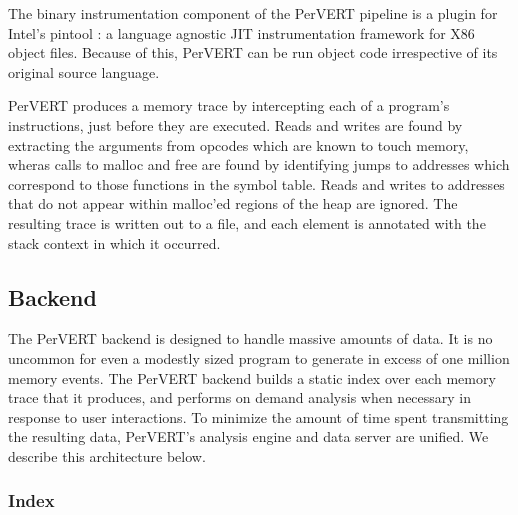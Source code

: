 \documentclass[annual]{acmsiggraph}
\begin{document}
    The binary instrumentation component of the PerVERT pipeline is a plugin for Intel's pintool \cite{Luk:2005:PBC:1065010.1065034}:
      a language agnostic JIT instrumentation framework for X86 object files.
    Because of this, PerVERT can be run object code irrespective of its original source language.

    PerVERT produces a memory trace by intercepting each of a program's instructions, just before they are executed.
    Reads and writes are found by extracting the arguments from opcodes which are known to touch memory,
      wheras calls to malloc and free are found by identifying jumps to addresses which correspond to those functions
      in the symbol table.
    Reads and writes to addresses that do not appear within malloc'ed regions of the heap are ignored.  
    The resulting trace is written out to a file, and each element is annotated with the stack context in which it occurred.  

  \subsection{Backend}

    The PerVERT backend is designed to handle massive amounts of data.
    It is no uncommon for even a modestly sized program to generate in excess of one million memory events.
    The PerVERT backend builds a static index over each memory trace that it produces, 
      and performs on demand analysis when necessary in response to user interactions.
    To minimize the amount of time spent transmitting the resulting data, 
      PerVERT's analysis engine and data server are unified.
    We describe this architecture below.

    \subsubsection{Index}
\end{document}
